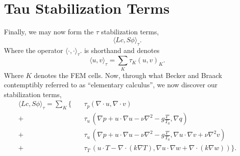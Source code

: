 %
%
\section{Tau Stabilization Terms}

Finally, we may now form the $\tau$ stabilization terms, 
\begin{equation}
 \langle Lc,S\phi \rangle_\tau. 
\end{equation}
Where the operator $ \langle \cdot,\cdot \rangle_\tau. $ is shorthand 
and denotes
\begin{equation}
 \langle u,v \rangle_\tau = \sum_K \tau_K (u,v)_K.
\end{equation}
Where $K$ denotes the FEM cells. Now, through what Becker and Braack
contemptibly referred to as ``elementary calculus'', we now discover our
stabilization terms,  
\begin{align*}
 \langle Lc,S\phi \rangle_\tau = \sum_K \{ \quad &\tau_p (\nabla \cdot u,
 \nabla \cdot v) \\
 +\quad &\tau_u \,(\nabla p + u \cdot \nabla u - \nu \nabla^2 - g \frac{T'}{T_0},
 \nabla q) \\
 +\quad &\tau_u \, (\nabla p + u \cdot \nabla u - \nu \nabla^2 - g \frac{T'}{T_0},
 \nabla u \cdot \nabla v + \nu \nabla^2 v) \\
 +\quad &\tau_T \, (u \cdot T - \nabla \cdot (k \nabla T), \nabla u \cdot \nabla
 w + \nabla \cdot (k \nabla w)) \}.
\end{align*}

